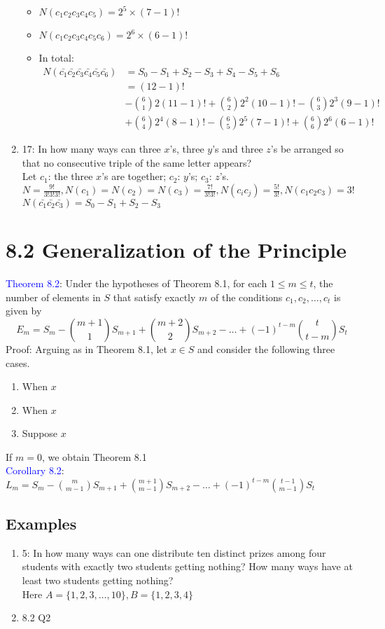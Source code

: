 \documentclass[a4paper]{article}
\begin{document}
\begin{enumerate}
\begin{itemize}
        \item $N(c_1c_2c_3c_4c_5)=2^5 \times (7-1)!$
        \item $N(c_1c_2c_3c_4c_5c_6)=2^6 \times (6-1)!$
        \item In total:\\
        \begin{align*}
            N(\bar{c_1}\bar{c_2}\bar{c_3}\bar{c_4}\bar{c_5}\bar{c_6})&=S_0-S_1+S_2-S_3+S_4-S_5+S_6\\
            &=(12-1)!\\
            &-\binom{6}{1}2(11-1)!+\binom{6}{2}2^2(10-1)!-\binom{6}{3}2^3(9-1)!\\
            &+\binom{6}{4}2^4(8-1)!-\binom{6}{5}2^5(7-1)!+\binom{6}{6}2^6(6-1)!
        \end{align*}
    \end{itemize}
    \item 17: In how many ways can three $x$’s, three $y$’s and three $z$’s be arranged so that no consecutive triple of the same letter appears?\\
    Let $c_1$: the three $x$'s are together; $c_2$: $y$'s; $c_3$: $z$'s.\\
    $N=\frac{9!}{3!3!3!},N(c_1)=N(c_2)=N(c_3)=\frac{7!}{3!3!},N(c_ic_j)=\frac{5!}{3!},N(c_1c_2c_3)=3!$\\
    $N(\bar{c_1}\bar{c_2}\bar{c_3})=S_0-S_1+S_2-S_3$
\end{enumerate}
\section*{8.2 Generalization of the Principle}
\textcolor{blue}{Theorem 8.2}: Under the hypotheses of Theorem 8.1, for each $1\leq m\leq t$, the number of elements in $S$ that satisfy exactly $m$ of the conditions $c_1, c_2, \dots, c_t$ is given by
$$
E_m=S_m-\binom{m+1}{1}S_{m+1}+\binom{m+2}{2}S_{m+2}-\dots +(-1)^{t-m}\binom{t}{t-m}S_t
$$
Proof: Arguing as in Theorem 8.1, let $x\in S$ and consider the following three cases.
\begin{enumerate}
    \item When $x$
    \item When $x$
    \item Suppose $x$
\end{enumerate}

If $m=0$, we obtain Theorem 8.1\\
\textcolor{blue}{Corollary 8.2}:  $L_m=S_m-\binom{m}{m-1}S_{m+1}+\binom{m+1}{m-1}S_{m+2}-\dots +(-1)^{t-m}\binom{t-1}{m-1}S_t$
\subsection*{Examples}
\begin{enumerate}
    \item 5: In how many ways can one distribute ten distinct prizes among four students with exactly two students getting nothing? How many ways have at least two students getting nothing?\\
    Here $A=\{1,2,3,\ldots, 10\},B=\{1,2,3,4\}$
    \item 8.2 Q2
\end{enumerate}
\end{document}
